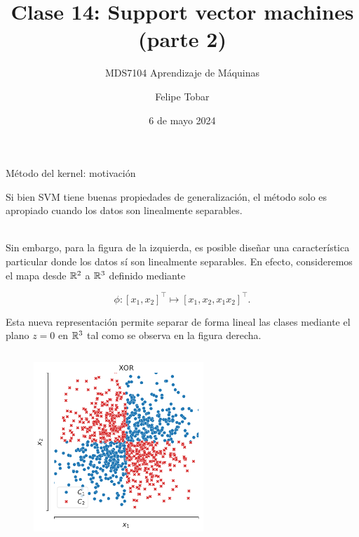 \documentclass[9pt, handout]{beamer}
\title{Clase 14: Support vector machines (parte 2)}
\subtitle{MDS7104 Aprendizaje de Máquinas}
\date{6 de mayo 2024}
\author{Felipe Tobar}
\institute{Iniciativa de Datos e Inteligencia Artificial\\Universidad de Chile}
\begin{document}
\begin{frame}
  \titlepage
\end{frame}

\begin{frame}{Método del kernel: motivación}

Si bien SVM tiene buenas propiedades de generalización, el método solo es apropiado cuando los datos son linealmente separables. \\~\ \pause

Sin embargo, para la figura de la izquierda, es posible diseñar una característica particular donde los datos sí son linealmente separables. En efecto, consideremos el mapa desde  $\mathbb{R}^2$ a $\mathbb{R}^3$ definido mediante

\begin{equation*}
	\phi: [x_1, x_2]^\top \mapsto [x_1, x_2, x_1 x_2]^\top.
\end{equation*}

Esta nueva representación permite separar de forma lineal las clases mediante el plano $z=0$ en $\mathbb{R}^3$ tal como se observa en la figura derecha.

\begin{columns}
\begin{column}{0.5\textwidth}
\begin{figure}[ht]
    \centering
    \includegraphics[width=0.6\textwidth]{../../img/cap5_xor}
\end{figure}	
\end{column}

\begin{column}{0.5\textwidth}
	

\end{column}
\end{columns}
\end{frame}
\end{document}
